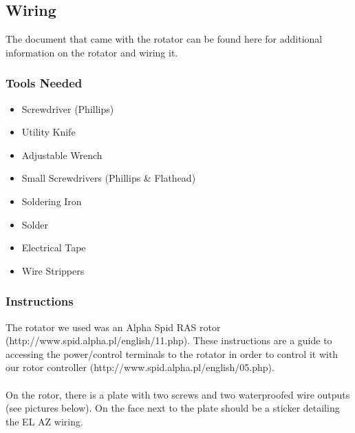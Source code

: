 \documentclass[11pt]{article} %
\begin{document}
\subsection{Wiring}


The document that came with the rotator can be found here for additional information on the rotator and wiring it.

\subsubsection{Tools Needed}
\begin{itemize}
\item Screwdriver (Phillips)
\item Utility Knife
\item Adjustable Wrench
\item Small Screwdrivers (Phillips \& Flathead)
\item Soldering Iron
\item Solder
\item Electrical Tape
\item Wire Strippers
\end{itemize}

\subsubsection{Instructions}

The rotator we used was an Alpha Spid RAS rotor (http://www.spid.alpha.pl/english/11.php). These instructions are a guide to accessing the power/control terminals to the rotator in order to control it with our rotor controller (http://www.spid.alpha.pl/english/05.php). \\ \\
On the rotor, there is a plate with two screws and two waterproofed wire outputs (see pictures below). On the face next to the plate should be a sticker detailing the EL AZ wiring.
\end{document}
